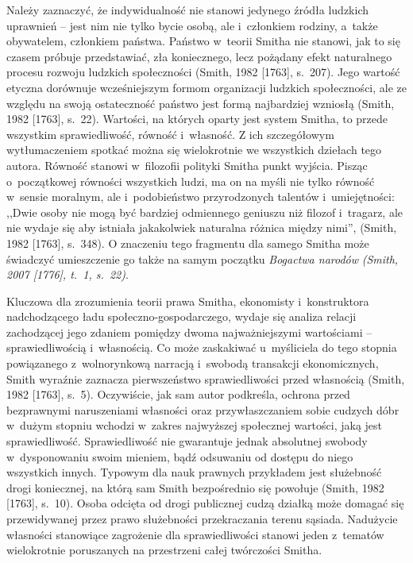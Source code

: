 Należy zaznaczyć, że indywidualność nie stanowi jedynego źródła ludzkich uprawnień -- jest nim nie tylko bycie osobą, ale i~członkiem rodziny, a~także obywatelem, członkiem państwa. Państwo w~teorii Smitha nie stanowi, jak to się czasem próbuje przedstawiać, zła koniecznego, lecz pożądany efekt naturalnego procesu rozwoju ludzkich społeczności \label{ref:RNDLLHqgagP0f}(Smith, 1982 [1763], s.~207). Jego wartość etyczna dorównuje wcześniejszym formom organizacji ludzkich społeczności, ale ze względu na swoją ostateczność państwo jest formą najbardziej wzniosłą \label{ref:RNDKABNqSVWe4}(Smith, 1982 [1763], s.~22). Wartości, na których oparty jest system Smitha, to przede wszystkim sprawiedliwość, równość i~własność. Z ich szczegółowym wytłumaczeniem spotkać można się wielokrotnie we wszystkich dziełach tego autora. Równość stanowi w~filozofii polityki Smitha punkt wyjścia. Pisząc o~początkowej równości wszystkich ludzi, ma on na myśli nie tylko równość w~sensie moralnym, ale i~podobieństwo przyrodzonych talentów i~umiejętności: ,,Dwie osoby nie mogą być bardziej odmiennego geniuszu niż filozof i~tragarz, ale nie wydaje się aby istniała jakakolwiek naturalna różnica między nimi'', \label{ref:RNDlX5tlrl30w}(Smith, 1982 [1763], s.~348). O znaczeniu tego fragmentu dla samego Smitha może świadczyć umieszczenie go także na samym początku \textit{Bogactwa narodów} \label{ref:RNDeavcgj1oLe}\textit{(Smith, 2007 [1776], t.~1, s.~22)}.

Kluczowa dla zrozumienia teorii prawa Smitha, ekonomisty i~konstruktora nadchodzącego ładu społeczno-gospodarczego, wydaje się analiza relacji zachodzącej jego zdaniem pomiędzy dwoma najważniejszymi wartościami -- sprawiedliwością i~własnością. Co może zaskakiwać u~myśliciela do tego stopnia powiązanego z~wolnorynkową narracją i~swobodą transakcji ekonomicznych, Smith wyraźnie zaznacza pierwszeństwo sprawiedliwości przed własnością \label{ref:RNDOpWvKBrvEq}(Smith, 1982 [1763], s.~5). Oczywiście, jak sam autor podkreśla, ochrona przed bezprawnymi naruszeniami własności oraz przywłaszczaniem sobie cudzych dóbr w~dużym stopniu wchodzi w~zakres najwyższej społecznej wartości, jaką jest sprawiedliwość. Sprawiedliwość nie gwarantuje jednak absolutnej swobody w~dysponowaniu swoim mieniem, bądź odsuwaniu od dostępu do niego wszystkich innych. Typowym dla nauk prawnych przykładem jest służebność drogi koniecznej, na którą sam Smith bezpośrednio się powołuje \label{ref:RNDA439GNDamV}(Smith, 1982 [1763], s.~10). Osoba odcięta od drogi publicznej cudzą działką może domagać się przewidywanej przez prawo służebności przekraczania terenu sąsiada. Nadużycie własności stanowiące zagrożenie dla sprawiedliwości stanowi jeden z~tematów wielokrotnie poruszanych na przestrzeni całej twórczości Smitha.

